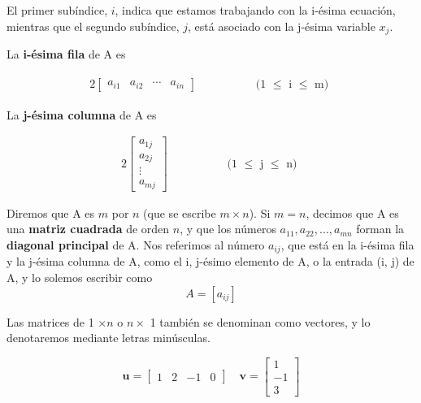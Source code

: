 \documentclass{article}
\begin{document}
El primer subíndice, $i$, indica que estamos trabajando con la i-ésima ecuación, mientras que el segundo subíndice, $j$, está asociado con la j-ésima variable $x_j$.

La \textbf{i-ésima fila} de A es 

\begin{alignat*}{2}
    \begin{bmatrix}
        a_{i1} & a_{i2} & \dotsb & a_{in} 
    \end{bmatrix} 
& \hspace{ 4em}%
    \begin{split}
        \text{(1 $\leq$ i $\leq$ m)}
    \end{split} 
\end{alignat*}

La \textbf{j-ésima columna} de A es 

\begin{alignat*}{2}
    \begin{bmatrix}
        a_{1j}\\
        a_{2j}\\
        \vdots\\ 
        a_{mj} 
    \end{bmatrix} 
& \hspace{ 4em}%
    \begin{split}
        \text{(1 $\leq$ j $\leq$ n)}
    \end{split} 
\end{alignat*}

Diremos que A es $m$ por $n$ (que se escribe $m \times n$). Si $m = n$, decimos que A es una \textbf{matriz cuadrada} de orden $n$, y que los números $ a_{11}, a_{22},\dots, a_{mn} $ forman la \textbf{diagonal principal} de A. Nos referimos al número $a_{ij}$, que está en la i-ésima fila y la j-ésima columna de A, como el i, j-ésimo elemento de A, o la entrada (i, j) de A, y lo solemos escribir como $$A = [a_{ij}]$$

Las matrices de 1 $\times n$ o $n \times$ 1 también se denominan como vectores, y lo denotaremos mediante letras minúsculas.

\begin{equation*}
    \mathbf{u}=\left[
    \begin{array}{llll}
        1 & 2 & -1 & 0
        \end{array}\right] \quad \mathbf{v}=\left[\begin{array}{r}
        1 \\
        -1 \\
        3
    \end{array}\right]
\end{equation*}
\end{document}
